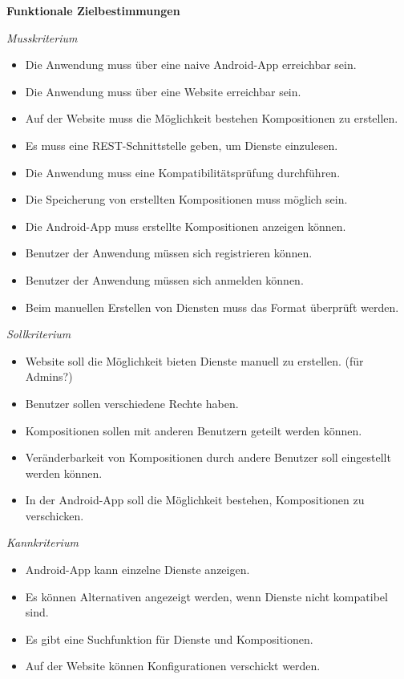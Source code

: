 
\textbf{Funktionale Zielbestimmungen}\newline

\textit{Musskriterium}

\begin{itemize}[leftmargin=4pc]
	\item Die Anwendung muss über eine naive Android-App erreichbar sein.
	\item Die Anwendung muss über eine Website erreichbar sein.
	\item Auf der Website muss die Möglichkeit bestehen Kompositionen zu erstellen.
	\item Es muss eine REST-Schnittstelle geben, um Dienste einzulesen.
	\item Die Anwendung muss eine Kompatibilitätsprüfung durchführen.
	\item Die Speicherung von erstellten Kompositionen muss möglich sein.
	\item Die Android-App muss erstellte Kompositionen anzeigen können.
	\item Benutzer der Anwendung müssen sich registrieren können.
	\item Benutzer der Anwendung müssen sich anmelden können.
	\item Beim manuellen Erstellen von Diensten muss das Format überprüft werden.
\end{itemize}

\textit{Sollkriterium}

\begin{itemize}[leftmargin=4pc]
	\item Website soll die Möglichkeit bieten Dienste manuell zu erstellen. (für Admins?)
	\item Benutzer sollen verschiedene Rechte haben.
	\item Kompositionen sollen mit anderen Benutzern geteilt werden können.
	\item Veränderbarkeit von Kompositionen durch andere Benutzer soll eingestellt werden können.
	\item In der Android-App soll die Möglichkeit bestehen, Kompositionen zu verschicken.
\end{itemize}

\textit{Kannkriterium}

\begin{itemize}[leftmargin=4pc]
	\item Android-App kann einzelne Dienste anzeigen.
	\item Es können Alternativen angezeigt werden, wenn Dienste nicht kompatibel sind.
	\item Es gibt eine Suchfunktion für Dienste und Kompositionen.
	\item Auf der Website können Konfigurationen verschickt werden.
\end{itemize}

